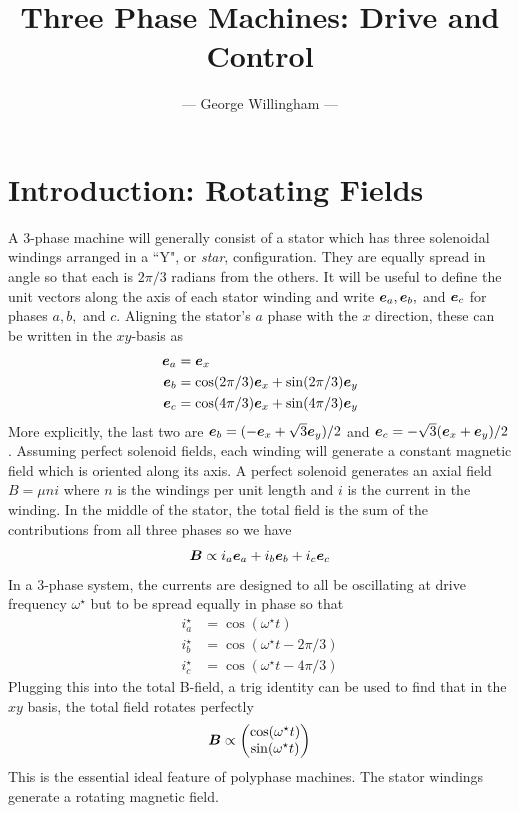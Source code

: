 \documentclass[onecolumn]{gwclass}
\title{Three Phase Machines: Drive and Control}
\author{--- George Willingham ---}
\date{}
\begin{document}
	\maketitle
	
	\section{Introduction: Rotating Fields}
	A 3-phase machine will generally consist of a stator which has three solenoidal windings arranged in a ``Y", or \emph{star}, configuration. They are equally spread in angle so that each is $2\pi/3$ radians from the others. It will be useful to define the unit vectors along the axis of each stator winding and write $\boldsymbol{e}_a, \boldsymbol{e}_b,$ and $\boldsymbol{e}_c$ for phases $a,b,$ and $c$. Aligning the stator's $a$ phase with the $x$ direction, these can be written in the $xy$-basis as
	\begin{align*}
		\boldsymbol{e}_a &= \boldsymbol{e}_x \\
		\boldsymbol{e}_b &= \cos(2\pi/3)\boldsymbol{e}_x + \sin(2\pi/3)\boldsymbol{e}_y \\
		\boldsymbol{e}_c &= \cos(4\pi/3)\boldsymbol{e}_x + \sin(4\pi/3)\boldsymbol{e}_y
	\end{align*}
	More explicitly, the last two are $ \boldsymbol{e}_b = (-\boldsymbol{e}_x + \sqrt{3}\boldsymbol{e}_y)/2$ and $ \boldsymbol{e}_c = -\sqrt{3}(\boldsymbol{e}_x + \boldsymbol{e}_y)/2 $.
	Assuming perfect solenoid fields, each winding will generate a constant magnetic field which is oriented along its axis. A perfect solenoid generates an axial field $B=\mu n i$ where $n$ is the windings per unit length and $i$ is the current in the winding. In the middle of the stator, the total field is the sum of the contributions from all three phases so we have
	$$ \boldsymbol{B} \propto i_a\boldsymbol{e}_a + i_b\boldsymbol{e}_b + i_c\boldsymbol{e}_c $$
	In a 3-phase system, the currents are designed to all be oscillating at drive frequency $\omega^\star$ but to be spread equally in phase so that 
	\begin{align*}
		i^\star_a &= \cos(\omega^\star t) \\
		i^\star_b &= \cos(\omega^\star t - 2\pi/3)\\
		i^\star_c &= \cos(\omega^\star t - 4\pi/3)
	\end{align*}
	Plugging this into the total B-field, a trig identity can be used to find that in the $xy$ basis, the total field rotates perfectly
	$$ \boldsymbol{B} \propto \begin{pmatrix}
		\cos(\omega^\star t) \\
		\sin(\omega^\star t)
	\end{pmatrix} $$
	This is the essential ideal feature of polyphase machines. The stator windings generate a rotating magnetic field.
\end{document}

